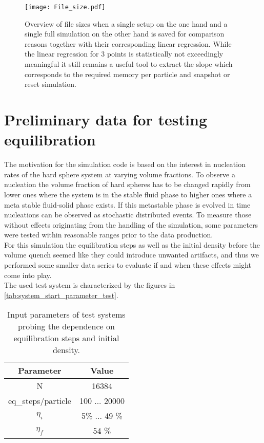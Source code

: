 \begin{figure}[h!]
\centering
\texttt{[image: File\_size.pdf]}
\caption[File size estimate]{Overview of file sizes when a single setup on the one hand and a single full simulation on the other hand is saved for comparison reasons together with their corresponding linear regression. While the linear regression for 3 points is statistically not exceedingly meaningful it still remains a useful tool to extract the slope which corresponds to the required memory per particle and snapshot or reset simulation.}
\label{fig:file_size}
\end{figure}

\section{Preliminary data for testing equilibration}
\label{sec:data}
The motivation for the simulation code is based on the interest in nucleation rates of the hard sphere system at varying volume fractions. To observe a nucleation the volume fraction of hard spheres has to be changed rapidly from lower ones where the system is in the stable fluid phase to higher ones where a meta stable fluid-solid phase exists. If this metastable phase is evolved in time nucleations can be observed as stochastic distributed events. To measure those without effects originating from the handling of the simulation, some parameters were tested within reasonable ranges prior to the data production.\\
For this simulation the equilibration steps as well as the initial density before the volume quench seemed like they could introduce unwanted artifacts, and thus we performed some smaller data series to evaluate if and when these effects might come into play.\\

The used test system is characterized by the figures in \autoref{tab:system_start_parameter_test}.

\begin{table}
\centering
\begin{tabular}{c|c}
Parameter & Value \\ \hline
N & 16384 \\
eq\_steps/particle & 100 ... 20000 \\
$\eta_i$ & 5\% ... 49 \% \\
$\eta_f$ & 54 \% \\
\end{tabular}
\caption[Simulation parameters for testing equilibration step number and initial density]{Input parameters of test systems probing the dependence on equilibration steps and initial density.}
\label{tab:system_start_parameter_test}
\end{table}

